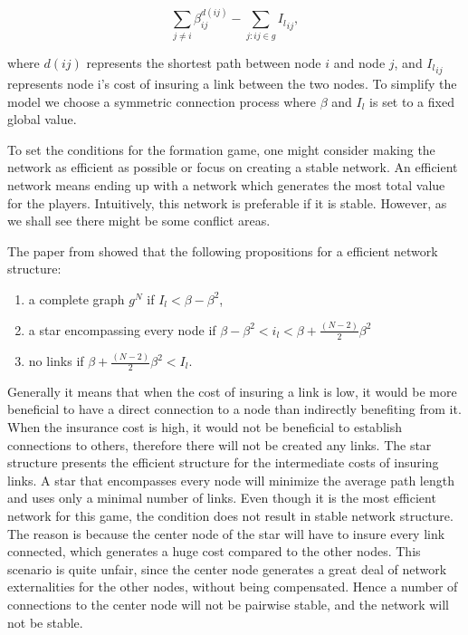 \begin{equation}
\sum_{j\neq i}^{} \beta_{ij}^{d(ij)} - \sum_{j:ij\in g}^{} {I_{l}}_{ij}, 
\label{connecetionGame}
\end{equation}

where $d(ij)$ represents the shortest path between node $i $ and node $j $, and ${I_{l}}_{ij}$ represents node i's cost of insuring a link between the two nodes. To simplify the model we choose a symmetric connection process where $\beta$ and $I_{l}$ is set to a fixed global value. 

To set the conditions for the formation game, one might consider making the network as efficient as possible or focus on creating a stable network. An efficient network means ending up with a network which generates the most total value for the players. Intuitively, this network is preferable if it is stable. However, as we shall see there might be some conflict areas. 

The paper from \cite{jackson1996strategic} showed that the following propositions for a efficient network structure:
\begin{enumerate}
\item a complete graph $g^N$ if $I_{l}<\beta - \beta^2$,
\item a star encompassing every node if $\beta - \beta^2 < i_{l} < \beta + \frac{(N-2)}{2}\beta^2$
\item no links if $\beta + \frac{(N-2)}{2}\beta^2 < I_{l}.$
\end{enumerate}

Generally it means that when the cost of insuring a link is low, it would be more beneficial to have a direct connection to a node than indirectly benefiting from it. When the insurance cost is high, it would not be beneficial to establish connections to others, therefore there will not be created any links. 
The star structure presents the efficient structure for the intermediate costs of insuring links. A star that encompasses every node will minimize the average path length and uses only a minimal number of links. Even though it is the most efficient network for this game, the condition does not result in stable network structure. The reason is because the center node of the star will have to insure every link connected, which generates a huge cost compared to the other nodes. This scenario is quite unfair, since the center node generates a great deal of network externalities for the other nodes, without being compensated. Hence a number of connections to the center node will not be pairwise stable, and the network will not be stable. 

